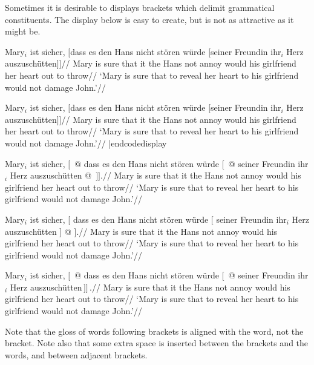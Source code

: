 \noindent Sometimes it is desirable to displays brackets which
delimit grammatical constituents.  The display below is easy to
create, but is not as attractive as it might be.

\smallskip
\framedisplay
\ex[glstyle=wrap]
\begingl
\gla Mary$_i$ ist sicher, $[$dass es den Hans nicht st\"oren
w\"urde $[$seiner Freundin ihr$_i$ Herz auszusch\"utten$]]$//
\glb Mary is sure that it the Hans not annoy would
his girlfriend her heart {out to throw}//
\glft `Mary is sure that to reveal her heart to his girlfriend
would not damage John.'//
\endgl
\xe
\endframedisplay
\smallskip

\codedisplay
\ex[glstyle=wrap]
\begingl
\gla Mary$_i$ ist sicher, $[$dass es den Hans nicht st\"oren
w\"urde $[$seiner Freundin ihr$_i$ Herz auszusch\"utten$]]$//
\glb Mary is sure that it the Hans not annoy would
his girlfriend her heart {out to throw}//
\glft `Mary is sure that to reveal her heart to his girlfriend
would not damage John.'//
\endgl
\xe
|endcodedisplay

\framedisplay \makeatletter
\ex[glstyle=wrap,glbrackwordsep=.1em,glbrackbracksep=.04em]
\begingl
\gla Mary$_i$ ist sicher, $[\,$ @ dass es den Hans nicht st\"oren
w\"urde $[\,$ @ seiner Freundin ihr$_i$ Herz auszusch\"utten
@ $\,]].$//
\glb Mary is sure {} that it the Hans not annoy would
{} his girlfriend her heart {out to throw}//
\glft `Mary is sure that to reveal her heart to his girlfriend
would not damage John.'//
\endgl
\xe
\endframedisplay

\smallskip
\framedisplay \makeatletter
\ex[glstyle=wrap,glbrackwordsep=.1em,glbrackbracksep=.0em]
\begingl
\gla Mary$_i$ ist sicher, [ dass es den Hans nicht st\"oren
w\"urde [ seiner Freundin ihr$_i$ Herz auszusch\"utten ] @ $].$//
\glb Mary is sure that it the Hans not annoy would
his girlfriend her heart {out to throw}//
\glft `Mary is sure that to reveal her heart to his girlfriend
would not damage John.'//
\endgl
\xe
\endframedisplay
\smallskip

\framedisplay
\ex[glstyle=wrap]
\begingl
\gla Mary$_i$ ist sicher, $[\,$ @ dass es den Hans nicht st\"oren
w\"urde $[\,$ @ seiner Freundin ihr$_i$ Herz auszusch\"utten$\,]]\,.$//
\glb Mary is sure {} that it the Hans not annoy would
{} his girlfriend her heart {out to throw}//
\glft `Mary is sure that to reveal her heart to his girlfriend
would not damage John.'//
\endgl
\xe
\endframedisplay
\smallskip

\noindent Note that the gloss of words following brackets is
aligned with the word, not the bracket.  Note also that some
extra space is inserted between the brackets and the words, and
between adjacent brackets.


